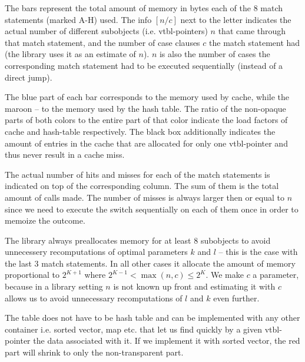 The bars represent the total amount of memory in bytes each of the 8 match 
statements (marked A-H) used. The info $[n/c]$ next to the letter indicates the 
actual number of different subobjects (i.e. vtbl-pointers) $n$ that came through 
that match statement, and the number of case clauses $c$ the match statement had 
(the library uses it as an estimate of $n$). $n$ is also the number of cases the 
corresponding match statement had to be executed sequentially (instead of a 
direct jump).

The blue part of each bar corresponds to the memory used by cache, while the 
maroon -- to the memory used by the hash table. The ratio of the non-opaque 
parts of both colors to the entire part of that color indicate the load factors 
of cache and hash-table respectively. The black box additionally indicates the 
amount of entries in the cache that are allocated for only one vtbl-pointer and 
thus never result in a cache miss. %

The actual number of hits and misses for each of the match statements is 
indicated on top of the corresponding column. The sum of them is the total 
amount of calls made. %
The number of misses is always larger then or equal to $n$ since we need to 
execute the switch sequentially on each of them once in order to memoize the 
outcome.

The library always preallocates memory for at least 8 subobjects to avoid 
unnecessery recomputations of optimal parameters $k$ and $l$ -- this is the case 
with the last 3 match statements. In all other cases it allocate the amount of 
memory proportional to $2^{K+1}$ where $2^{K-1} < \max(n,c) \le 2^{K}$. We make 
$c$ a parameter, because in a library setting $n$ is not known up front and 
estimating it with $c$ allows us to avoid unnecessary recomputations of $l$ and 
$k$ even further. 

The table does not have to be hash table and can be implemented with 
any other container i.e. sorted vector, map etc. that let us find quickly by a given 
vtbl-pointer the data associated with it. If we implement it with sorted vector, 
the red part will shrink to only the non-transparent part.

